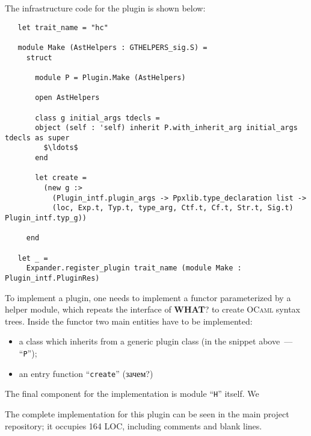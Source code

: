 The infrastructure code for the plugin is shown below:

\begin{lstlisting}
   let trait_name = "hc"
  
   module Make (AstHelpers : GTHELPERS_sig.S) =
     struct

       module P = Plugin.Make (AstHelpers)

       open AstHelpers

       class g initial_args tdecls =
       object (self : 'self) inherit P.with_inherit_arg initial_args tdecls as super
         $\ldots$
       end

       let create =
         (new g :>
           (Plugin_intf.plugin_args -> Ppxlib.type_declaration list ->
           (loc, Exp.t, Typ.t, type_arg, Ctf.t, Cf.t, Str.t, Sig.t) Plugin_intf.typ_g))

     end

   let _ =
     Expander.register_plugin trait_name (module Make : Plugin_intf.PluginRes)
\end{lstlisting}

To implement a plugin, one needs to implement a functor parameterized by a helper module, which
repeats the interface of \textbf{WHAT}? to create \textsc{OCaml} syntax trees. Inside the
functor two main entities have to be implemented:

\begin{itemize}
\item a class which inherits from a generic plugin class (in the snippet above~--- ``\lstinline{P}'');
\item an entry function ``\lstinline{create}'' (зачем?)
\end{itemize}

The final component for the implementation is module ``\lstinline{H}'' itself. We

The complete implementation for this plugin can be seen in the main project repository; it occupies 164 LOC, including
comments and blank lines.

